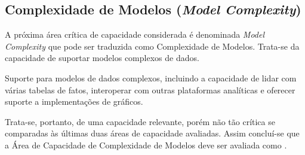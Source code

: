 \subsection{Complexidade de Modelos (\emph{Model Complexity})}
\label{sub-complexity}

A próxima área crítica de capacidade considerada é denominada \emph{Model Complexity} que pode ser traduzida como Complexidade de Modelos. Trata-se da capacidade de suportar modelos complexos de dados.

\begin{definition}
Suporte para modelos de dados complexos, incluindo a capacidade de lidar com várias tabelas de fatos, interoperar com outras plataformas analíticas e oferecer suporte a implementações de gráficos.
\end{definition}

Trata-se, portanto, de uma capacidade relevante, porém não tão crítica se comparadas às últimas duas áreas de capacidade avaliadas. Assim concluí-se que a Área de Capacidade de Complexidade de Modelos deve ser avaliada como \SHOULD.